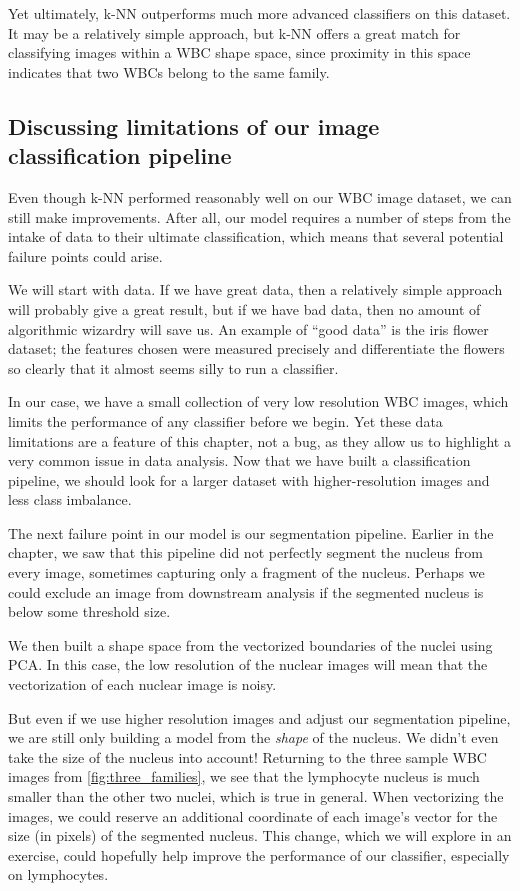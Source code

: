 Yet ultimately, k-NN outperforms much more advanced classifiers on this dataset. It may be a relatively simple approach, but k-NN offers a great match for classifying images within a WBC shape space, since proximity in this space indicates that two WBCs belong to the same family.

\FloatBarrier
{}
\subsection{Discussing limitations of our image classification pipeline}

Even though k-NN performed reasonably well on our WBC image dataset, we can still make improvements. After all, our model requires a number of steps from the intake of data to their ultimate classification, which means that several potential failure points could arise.

We will start with data. If we have great data, then a relatively simple approach will probably give a great result, but if we have bad data, then no amount of algorithmic wizardry will save us. An example of ``good data'' is the iris flower dataset; the features chosen were measured precisely and differentiate the flowers so clearly that it almost seems silly to run a classifier.

In our case, we have a small collection of very low resolution WBC images, which limits the performance of any classifier before we begin. Yet these data limitations are a feature of this chapter, not a bug, as they allow us to highlight a very common issue in data analysis. Now that we have built a classification pipeline, we should look for a larger dataset with higher-resolution images and less class imbalance.

The next failure point in our model is our segmentation pipeline. Earlier in the chapter, we saw that this pipeline did not perfectly segment the nucleus from every image, sometimes capturing only a fragment of the nucleus. Perhaps we could exclude an image from downstream analysis if the segmented nucleus is below some threshold size.

We then built a shape space from the vectorized boundaries of the nuclei using PCA. In this case, the low resolution of the nuclear images will mean that the vectorization of each nuclear image is noisy.

But even if we use higher resolution images and adjust our segmentation pipeline, we are still only building a model from the \textit{shape} of the nucleus. We didn't even take the size of the nucleus into account! Returning to the three sample WBC images from \autoref{fig:three_families}, we see that the lymphocyte nucleus is much smaller than the other two nuclei, which is true in general. When vectorizing the images, we could reserve an additional coordinate of each image's vector for the size (in pixels) of the segmented nucleus. This change, which we will explore in an exercise, could hopefully help improve the performance of our classifier, especially on lymphocytes.\\

